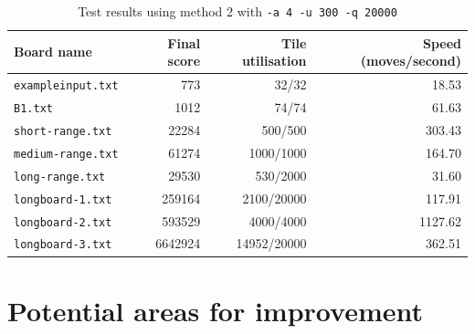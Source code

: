 \documentclass[a4paper, 11pt, titlepage]{report}
\begin{document}
\begin{table}[H]
  \centering
  \caption{Test results using method 2 with \texttt{-a 4 -u 300 -q 20000}}
    \begin{tabular}{lrrr}
    \hline
    Board name & Final score & Tile utilisation & Speed (moves/second) \\
    \hline
    \texttt{exampleinput.txt} &   773    &   32/32    & 18.53  \\
    \texttt{B1.txt} &   1012    &  74/74     &  61.63 \\
    \texttt{short-range.txt} & 22284 & 500/500 & 303.43 \\
    \texttt{medium-range.txt} & 61274 & 1000/1000 & 164.70 \\
    \texttt{long-range.txt} & 29530 & 530/2000 & 31.60 \\
    \texttt{longboard-1.txt} & 259164 & 2100/20000 & 117.91 \\
    \texttt{longboard-2.txt} & 593529 & 4000/4000 & 1127.62 \\
    \texttt{longboard-3.txt} & 6642924 & 14952/20000 & 362.51 \\
    \hline
    \end{tabular}%
  \label{tab:results-method2-modded}%
\end{table}%





\chapter{Potential areas for improvement}

\renewcommand{\bibname}{References}

  
\end{document}
